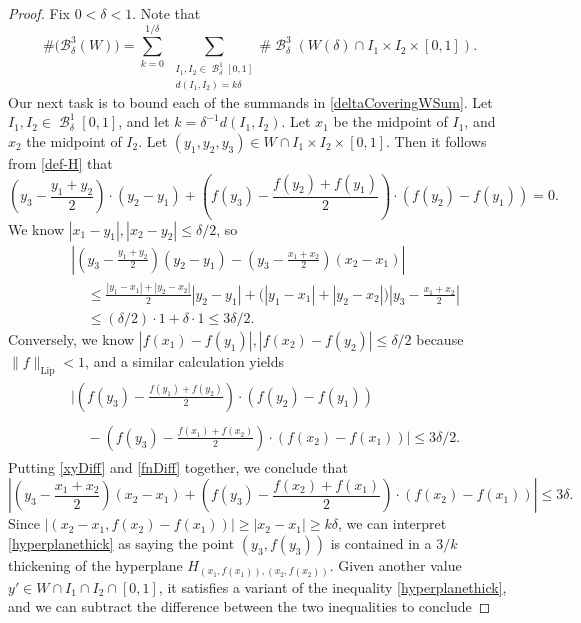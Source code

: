 \documentclass[dvipsnames,letterpaper,12pt]{article}
\numberwithin{equation}{section}
\theoremstyle{plain}
\theoremstyle{remark}
\DeclareMathOperator{\B}{\mathcal{B}}
\begin{document}
\begin{proof}
Fix $0 < \delta < 1$. Note that
	\begin{equation}\label{deltaCoveringWSum}
		\# \bigl(\mathcal B_{\delta}^3(W) \bigr) = \sum_{k = 0}^{1/\delta}\ \sum_{\substack{I_1, I_2 \in \B^1_\delta[0,1]\\d(I_1,I_2) = k\delta}} \# \B^3_\delta(W(\delta) \cap I_1 \times I_2 \times [0,1]).
	\end{equation}
	Our next task is to bound each of the summands in \eqref{deltaCoveringWSum}.
	 Let $I_1, I_2 \in \B^1_\delta[0,1]$, and let $k = \delta^{-1}d(I_1,I_2)$. Let $x_1$ be the midpoint of $I_1$, and $x_2$ the midpoint of $I_2$. Let $(y_1,y_2,y_3) \in W \cap I_1 \times I_2 \times [0,1]$. Then it follows from \eqref{def-H} that 
	\[ \left( y_3 - \frac{y_1 + y_2}{2} \right) \cdot (y_2 - y_1) + \left( f(y_3) - \frac{f(y_2) + f(y_1)}{2} \right) \cdot (f(y_2) - f(y_1)) = 0. \]
	We know $|x_1 - y_1|, |x_2 - y_2| \leq \delta/2$, so
	\begin{align} \label{xyDiff}
		&\left| \left( y_3 - \frac{y_1 + y_2}{2} \right) (y_2 - y_1) - \left( y_3 - \frac{x_1 + x_2}{2} \right) (x_2 - x_1) \right| \nonumber\\
		&\ \ \ \ \ \leq \frac{|y_1 - x_1| + |y_2 - x_2|}{2} |y_2 - y_1| + \Big( |y_1 - x_1| + |y_2 - x_2| \Big) \left| y_3 - \frac{x_1 + x_2}{2} \right|\\
		&\ \ \ \ \ \leq (\delta/2) \cdot 1 + \delta \cdot 1 \leq 3\delta/2. \nonumber
	\end{align}
	Conversely, we know $|f(x_1) - f(y_1)|, |f(x_2) - f(y_2)| \leq \delta/2$ because $\| f \|_{\text{Lip}} < 1$, and a similar calculation yields
	\begin{align} \label{fnDiff}
	\begin{split}
		&\Big| \left( f(y_3) - \frac{f(y_1) + f(y_2)}{2} \right) \cdot (f(y_2) - f(y_1))\\
		\\&\ \ \ \ \ - \left( f(y_3) - \frac{f(x_1) + f(x_2)}{2} \right) \cdot (f(x_2) - f(x_1)) \Big|\leq 3\delta/2.
	\end{split}
	\end{align}
	Putting \eqref{xyDiff} and \eqref{fnDiff} together, we conclude that
	\begin{equation} \label{hyperplanethick}
		\left| \left( y_3 - \frac{x_1 + x_2}{2} \right) (x_2 - x_1) + \left( f(y_3) - \frac{f(x_2) + f(x_1)}{2} \right) \cdot (f(x_2) - f(x_1)) \right| \leq 3\delta.
	\end{equation}
	Since $|(x_2-x_1,f(x_2)-f(x_1))| \geq |x_2-x_1| \geq k\delta$, we can interpret \eqref{hyperplanethick} as saying the point $(y_3, f(y_3))$ is contained in a $3/k$ thickening of the hyperplane $H_{(x_1,f(x_1)), (x_2,f(x_2))}$. Given another value $y' \in W \cap I_1 \cap I_2 \cap [0,1]$, it satisfies a variant of the inequality \eqref{hyperplanethick}, and we can subtract the difference between the two inequalities to conclude

\end{proof}
\end{document}
